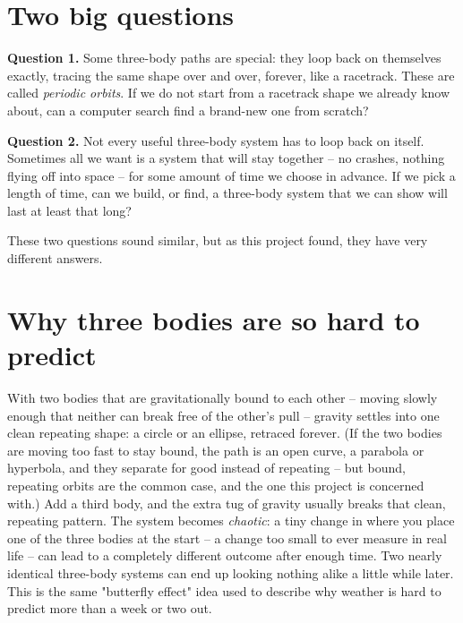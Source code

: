 \documentclass[11pt]{article}
\begin{document}
\section{Two big questions}

\textbf{Question 1.} Some three-body paths are special: they loop back on
themselves exactly, tracing the same shape over and over, forever, like a
racetrack. These are called \emph{periodic orbits}. If we do not start
from a racetrack shape we already know about, can a computer search find
a brand-new one from scratch?

\textbf{Question 2.} Not every useful three-body system has to loop back
on itself. Sometimes all we want is a system that will stay together --
no crashes, nothing flying off into space -- for some amount of time we
choose in advance. If we pick a length of time, can we build, or find, a
three-body system that we can show will last at least that long?

These two questions sound similar, but as this project found, they have
very different answers.

\section{Why three bodies are so hard to predict}

With two bodies that are gravitationally bound to each other -- moving
slowly enough that neither can break free of the other's pull -- gravity
settles into one clean repeating shape: a circle or an ellipse, retraced
forever. (If the two bodies are moving too fast to stay bound, the path
is an open curve, a parabola or hyperbola, and they separate for good
instead of repeating -- but bound, repeating orbits are the common case,
and the one this project is concerned with.) Add a third body, and the
extra tug of gravity usually breaks that clean, repeating pattern. The system becomes \emph{chaotic}: a tiny change
in where you place one of the three bodies at the start -- a change too
small to ever measure in real life -- can lead to a completely different
outcome after enough time. Two nearly identical three-body systems can
end up looking nothing alike a little while later. This is the same
"butterfly effect" idea used to describe why weather is hard to predict
more than a week or two out.
\end{document}

